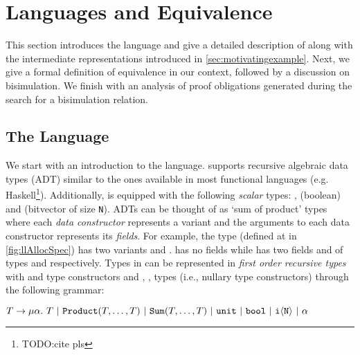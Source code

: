 \section{Languages and Equivalence}
\label{sec:lang-eqdef}

This section introduces the \SpecL{} language and give a detailed description of \SpecL{} along
with the intermediate representations introduced in \cref{sec:motivatingexample}.
Next, we give a formal definition of equivalence in our context, followed by a discussion on bisimulation.
We finish with an analysis of proof obligations generated during the search for a bisimulation relation.

\subsection{The \SpecL{} Language}
\label{sec:speclang}
We start with an introduction to the \SpecL{} language.
\SpecL{} supports recursive algebraic data types (ADT) similar to the ones available in most functional languages (e.g. Haskell\footnote{TODO:cite pls}).
Additionally, \SpecL{} is equipped with the following {\em scalar} types: ,  (boolean) and  (bitvector of size {\tt N}).
ADTs can be thought of as `sum of product' types where each {\em data constructor} represents a variant
and the arguments to each data constructor represents its {\em fields}.
For example, the  type (defined at  in \cref{fig:llAllocSpec}) has two variants  and .
 has no fields while  has two fields  and  of types  and  respectively.
Types in \SpecL{} can be represented in {\em first order recursive types} with  and  type constructors
and , ,  types (i.e., nullary type constructors) through the following grammar:

$T \rightarrow \mu \alpha.\ T \ |\  \type{Product}(T,\dots,T) \ |\  \type{Sum}(T,\dots,T) \ |\  \type{unit} \ |\ \type{bool} \ |\  \type{i\langle N \rangle} \ |\  \alpha$

